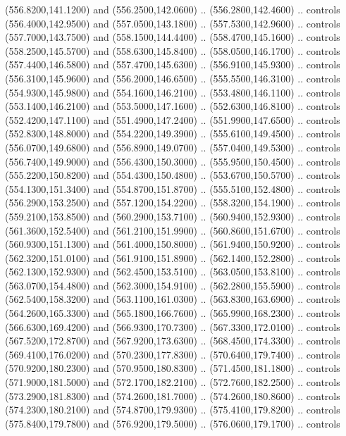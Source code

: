 {\begin{scope}[y=0.80pt, x=0.80pt, yscale=-1, xscale=1, inner sep=0pt, outer sep=0pt, #1]
      (556.8200,141.1200) and (556.2500,142.0600) .. (556.2800,142.4600) .. controls
      (556.4000,142.9500) and (557.0500,143.1800) .. (557.5300,142.9600) .. controls
      (557.7000,143.7500) and (558.1500,144.4400) .. (558.4700,145.1600) .. controls
      (558.2500,145.5700) and (558.6300,145.8400) .. (558.0500,146.1700) .. controls
      (557.4400,146.5800) and (557.4700,145.6300) .. (556.9100,145.9300) .. controls
      (556.3100,145.9600) and (556.2000,146.6500) .. (555.5500,146.3100) .. controls
      (554.9300,145.9800) and (554.1600,146.2100) .. (553.4800,146.1100) .. controls
      (553.1400,146.2100) and (553.5000,147.1600) .. (552.6300,146.8100) .. controls
      (552.4200,147.1100) and (551.4900,147.2400) .. (551.9900,147.6500) .. controls
      (552.8300,148.8000) and (554.2200,149.3900) .. (555.6100,149.4500) .. controls
      (556.0700,149.6800) and (556.8900,149.0700) .. (557.0400,149.5300) .. controls
      (556.7400,149.9000) and (556.4300,150.3000) .. (555.9500,150.4500) .. controls
      (555.2200,150.8200) and (554.4300,150.4800) .. (553.6700,150.5700) .. controls
      (554.1300,151.3400) and (554.8700,151.8700) .. (555.5100,152.4800) .. controls
      (556.2900,153.2500) and (557.1200,154.2200) .. (558.3200,154.1900) .. controls
      (559.2100,153.8500) and (560.2900,153.7100) .. (560.9400,152.9300) .. controls
      (561.3600,152.5400) and (561.2100,151.9900) .. (560.8600,151.6700) .. controls
      (560.9300,151.1300) and (561.4000,150.8000) .. (561.9400,150.9200) .. controls
      (562.3200,151.0100) and (561.9100,151.8900) .. (562.1400,152.2800) .. controls
      (562.1300,152.9300) and (562.4500,153.5100) .. (563.0500,153.8100) .. controls
      (563.0700,154.4800) and (562.3000,154.9100) .. (562.2800,155.5900) .. controls
      (562.5400,158.3200) and (563.1100,161.0300) .. (563.8300,163.6900) .. controls
      (564.2600,165.3300) and (565.1800,166.7600) .. (565.9900,168.2300) .. controls
      (566.6300,169.4200) and (566.9300,170.7300) .. (567.3300,172.0100) .. controls
      (567.5200,172.8700) and (567.9200,173.6300) .. (568.4500,174.3300) .. controls
      (569.4100,176.0200) and (570.2300,177.8300) .. (570.6400,179.7400) .. controls
      (570.9200,180.2300) and (570.9500,180.8300) .. (571.4500,181.1800) .. controls
      (571.9000,181.5000) and (572.1700,182.2100) .. (572.7600,182.2500) .. controls
      (573.2900,181.8300) and (574.2600,181.7000) .. (574.2600,180.8600) .. controls
      (574.2300,180.2100) and (574.8700,179.9300) .. (575.4100,179.8200) .. controls
      (575.8400,179.7800) and (576.9200,179.5000) .. (576.0600,179.1700) .. controls

\end{scope}}
